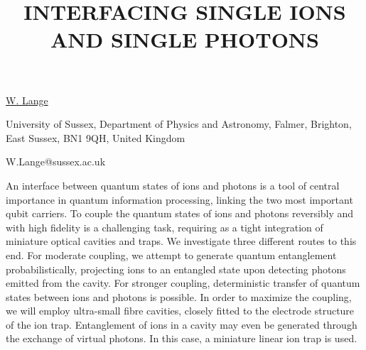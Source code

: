 \title{INTERFACING SINGLE IONS AND SINGLE PHOTONS}

\underline{W. Lange} 

{\normalsize{\vspace{-4mm}
University of Sussex, Department of Physics and Astronomy, Falmer,
Brighton, East Sussex, BN1 9QH, United Kingdom

\email W.Lange@sussex.ac.uk}}

An interface between quantum states of ions and photons is a tool of central importance in quantum information processing, linking the two most important qubit carriers. To couple the quantum states of ions and photons reversibly and with high fidelity is a challenging task, requiring as a tight integration of miniature optical cavities and traps. We investigate three different routes to this end. For moderate coupling, we attempt to generate quantum entanglement probabilistically, projecting ions to an entangled state upon detecting photons emitted from the cavity. For stronger coupling, deterministic transfer of quantum states between ions and photons is possible. In order to maximize the coupling, we will employ ultra-small fibre cavities, closely fitted to the electrode structure of the ion trap. Entanglement of ions in a cavity may even be generated through the exchange of virtual photons. In this case, a miniature linear ion trap is used.

\vspace{\baselineskip} 
